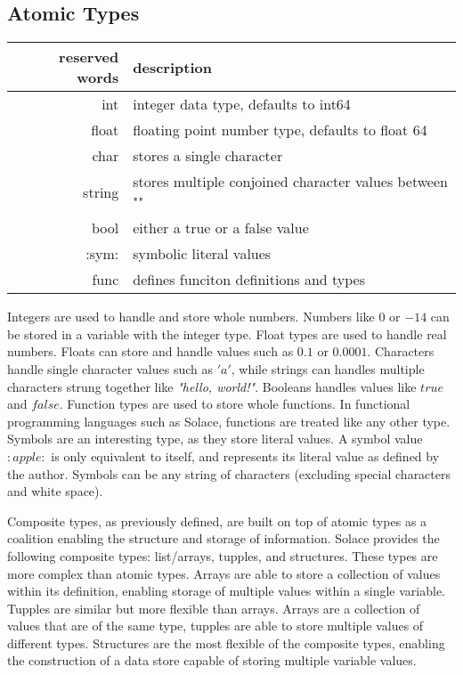 \documentclass{article}
\begin{document}
\subsection{Atomic Types}
\begin{center}
\begin{tabular}{|r|l|}
	\hline
	reserved words & description \\
	\hline
	\hline
	int & integer data type, defaults to int64 \\
	float & floating point number type, defaults to float 64 \\
	char & stores a single character \\
	string & stores multiple conjoined character values between "" \\
	bool & either a true or a false value \\
	:sym: & symbolic literal values \\
	func & defines funciton definitions and types \\
	\hline
\end{tabular}
\end{center}

Integers are used to handle and store whole numbers. Numbers like $0$ or $-14$ can be stored in a variable with the integer type. Float
types are used to handle real numbers. Floats can store and handle values such as $0.1$ or $0.0001$. Characters handle single character
values such as $'a'$, while strings can handles multiple characters strung together like \textit{"hello, world!"}. Booleans handles values like
$true$ and $false$. Function types are used to store whole functions. In functional programming languages such as Solace, functions are
treated like any other type. Symbols are an interesting type, as they store literal values. A symbol value $:apple:$ is only equivalent
to itself, and represents its literal value as defined by the author. Symbols can be any string of characters (excluding special
characters and white space).

Composite types, as previously defined, are built on top of atomic types as a coalition enabling the structure and storage of
information. Solace provides the following composite types: list/arrays, tupples, and structures. These types are more complex than
atomic types. Arrays are able to store a collection of values within its definition, enabling storage of multiple values within a single
variable. Tupples are similar but more flexible than arrays. Arrays are a collection of values that are of the same type, tupples are able
to store multiple values of different types. Structures are the most flexible of the composite types, enabling the construction of a data
store capable of storing multiple variable values.
\end{document}
